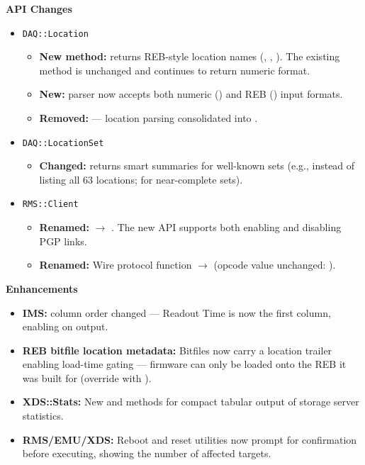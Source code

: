 \noindent\textbf{API Changes}\par\nobreak
\begin{itemize}\compactlist
  \item \texttt{DAQ::Location}
  \begin{itemize}\compactlist
    \item \textbf{New method:}  returns REB-style location names
      (, , ). The existing 
      method is unchanged and continues to return numeric  format.
    \item \textbf{New:}  parser now accepts both numeric ()
      and REB () input formats.
    \item \textbf{Removed:}  --- location parsing consolidated into
      .
  \end{itemize}
  \item \texttt{DAQ::LocationSet}
  \begin{itemize}\compactlist
    \item \textbf{Changed:}  returns smart summaries for well-known sets
      (e.g.,  instead of listing all 63 locations; 
      for near-complete sets).
  \end{itemize}
  \item \texttt{RMS::Client}
  \begin{itemize}\compactlist
    \item \textbf{Renamed:}  $\rightarrow$ .
      The new API supports both enabling and disabling PGP links.
    \item \textbf{Renamed:} Wire protocol function  $\rightarrow$ 
      (opcode value unchanged: ).
  \end{itemize}
\end{itemize}
\noindent\textbf{Enhancements}\par\nobreak
\begin{itemize}\compactlist
  \item \textbf{IMS:}  column order changed --- Readout Time is now
    the first column, enabling  on  output.
  \item \textbf{REB bitfile location metadata:} Bitfiles now carry a location trailer
    enabling load-time gating --- firmware can only be loaded onto the REB it
    was built for (override with ).
  \item \textbf{XDS::Stats:} New  and  methods for compact tabular
    output of storage server statistics.
  \item \textbf{RMS/EMU/XDS:} Reboot and reset utilities now prompt for confirmation
    before executing, showing the number of affected targets.
\end{itemize}

